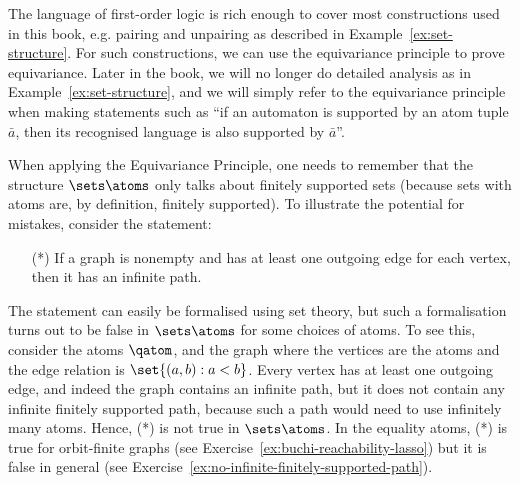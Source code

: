 The language of first-order logic is rich enough to cover most constructions used in this book, e.g. pairing and unpairing as described in Example~\ref{ex:set-structure}. For such constructions, we can use the equivariance principle to prove equivariance. Later in the book, we will no longer do detailed analysis as in Example~\ref{ex:set-structure}, and we will simply refer to the equivariance principle when making statements such as ``if an automaton is supported by an atom tuple $\bar a$, then its recognised language is also supported by $\bar a$''.

\begin{myexample} When applying the Equivariance Principle, one needs to remember that the structure $\sets \atoms$ 
	only talks about finitely supported sets (because sets with atoms are, by definition, finitely supported). To illustrate the potential for mistakes, 
		consider the statement: 
		\begin{itemize}
			\item[(*)] If a graph is nonempty and has at least one outgoing edge for each vertex, then it has an infinite path.
		\end{itemize}
		The statement can easily be formalised using set theory, but such a formalisation turns out to be false in $\sets \atoms$ for some choices of atoms. To see this, consider the atoms $\qatom$, and the graph where the vertices are the atoms and the edge relation is $\set{(a,b) : a < b}$. Every vertex has at least one outgoing edge, and indeed the graph contains an infinite path, but it does not contain any infinite finitely supported path, because such a path would need to use infinitely many atoms. Hence, (*) is not true in $\sets \atoms$. In the equality atoms, (*) is true for orbit-finite graphs (see Exercise~\ref{ex:buchi-reachability-lasso}) but it is false in general (see Exercise~\ref{ex:no-infinite-finitely-supported-path}). 
\end{myexample}





\exercisepart

